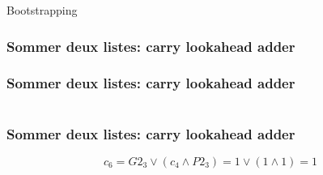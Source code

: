 \documentclass[10pt,xcolor={usenames,dvipsnames}]{beamer}
\begin{document}
\begin{section}{Bootstrapping}
\begin{frame}
\end{frame} 


\begin{frame} 
\frametitle{Sommer deux listes: carry lookahead adder}
  \begin{figure}
    \begin{center}
      \begin{tikzpicture}[scale = 0.7, transform shape]
      	
      \end{tikzpicture}
    \end{center}
  \end{figure}
\end{frame} 


\begin{frame} 
\frametitle{Sommer deux listes: carry lookahead adder}
  \begin{figure}
    \begin{center}
      \begin{tikzpicture}[scale = 0.7, transform shape]
      	
      \end{tikzpicture}
    \end{center}
  \end{figure}
\[\quad \]
\[\quad \]
\end{frame} 


\begin{frame} 
\frametitle{Sommer deux listes: carry lookahead adder}
  \begin{figure}
    \begin{center}
      \begin{tikzpicture}[scale = 0.7, transform shape]
      	
      \end{tikzpicture}
    \end{center}
  \end{figure}
\[c_6 = G2_3 \vee \left( c_4 \wedge P2_3\right) = 1 \vee \left( 1 \wedge 1 \right) = 1 \]
\[\quad\]
\end{frame} 


\end{section}
\end{document}
